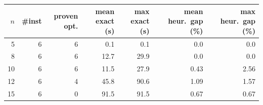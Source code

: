 \begin{tabular}{r r r r r r r}
\toprule
$n$ & \#inst & proven opt. & mean exact (s) & max exact (s) & mean heur.\ gap (\%) & max heur.\ gap (\%) \\
\midrule
5 & 6 & 6 & 0.1 & 0.1 & 0.0 & 0.0 \\
8 & 6 & 6 & 12.7 & 29.9 & 0.0 & 0.0 \\
10 & 6 & 6 & 11.5 & 27.9 & 0.43 & 2.56 \\
12 & 6 & 4 & 45.8 & 90.6 & 1.09 & 1.57 \\
15 & 6 & 0 & 91.5 & 91.5 & 0.67 & 0.67 \\
\bottomrule
\end{tabular}